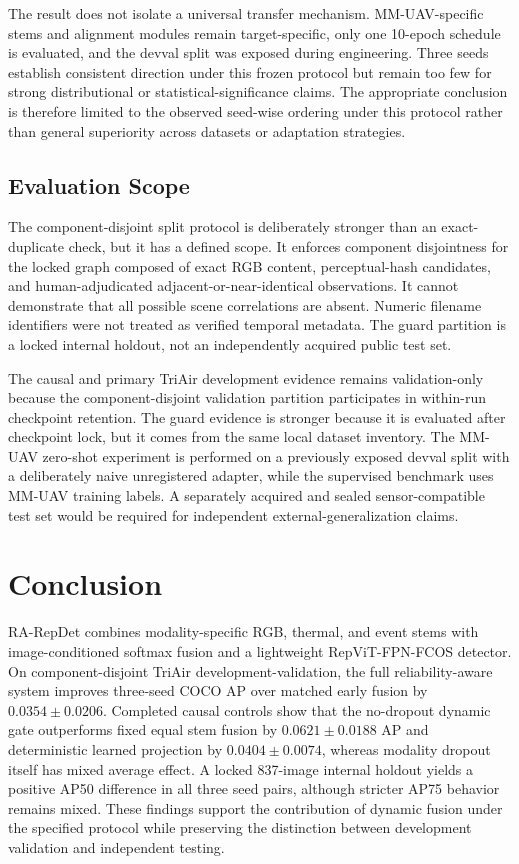 The result does not isolate a universal transfer mechanism. MM-UAV-specific stems and alignment modules remain target-specific, only one 10-epoch schedule is evaluated, and the devval split was exposed during engineering. Three seeds establish consistent direction under this frozen protocol but remain too few for strong distributional or statistical-significance claims. The appropriate conclusion is therefore limited to the observed seed-wise ordering under this protocol rather than general superiority across datasets or adaptation strategies.

\subsection{Evaluation Scope}
The component-disjoint split protocol is deliberately stronger than an exact-duplicate check, but it has a defined scope. It enforces component disjointness for the locked graph composed of exact RGB content, perceptual-hash candidates, and human-adjudicated adjacent-or-near-identical observations. It cannot demonstrate that all possible scene correlations are absent. Numeric filename identifiers were not treated as verified temporal metadata. The guard partition is a locked internal holdout, not an independently acquired public test set.

The causal and primary TriAir development evidence remains validation-only because the component-disjoint validation partition participates in within-run checkpoint retention. The guard evidence is stronger because it is evaluated after checkpoint lock, but it comes from the same local dataset inventory. The MM-UAV zero-shot experiment is performed on a previously exposed devval split with a deliberately naive unregistered adapter, while the supervised benchmark uses MM-UAV training labels. A separately acquired and sealed sensor-compatible test set would be required for independent external-generalization claims.

\section{Conclusion}
RA-RepDet combines modality-specific RGB, thermal, and event stems with image-conditioned softmax fusion and a lightweight RepViT-FPN-FCOS detector. On component-disjoint TriAir development-validation, the full reliability-aware system improves three-seed COCO AP over matched early fusion by $0.0354\pm0.0206$. Completed causal controls show that the no-dropout dynamic gate outperforms fixed equal stem fusion by $0.0621\pm0.0188$ AP and deterministic learned projection by $0.0404\pm0.0074$, whereas modality dropout itself has mixed average effect. A locked 837-image internal holdout yields a positive AP50 difference in all three seed pairs, although stricter AP75 behavior remains mixed. These findings support the contribution of dynamic fusion under the specified protocol while preserving the distinction between development validation and independent testing.

